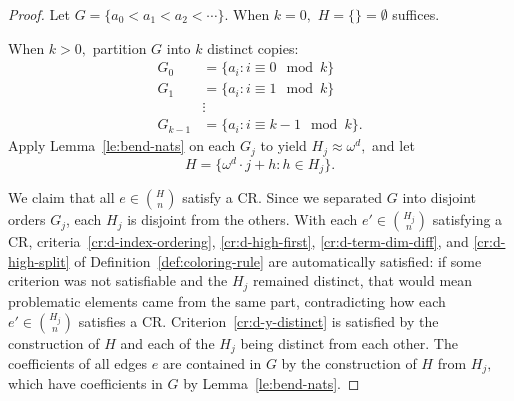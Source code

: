 \documentclass[10pt,a4paper]{article}
\newcommand{\om}{\omega}
\newcommand{\oequiv}{\approx}
\newcommand{\crulenospace}{CR}
\newcommand{\crules}{\crulenospace s~}
\newcommand{\idegr}{j}
\newcommand{\commonconst}{a}
\newcommand{\rareconst}{b}
\theoremstyle{plain}
\theoremstyle{definition}
\begin{document}
\begin{proof}
Let $G = \{\commonconst_0 < \commonconst_1 < \commonconst_2 < \cdots \}$.
When $k = 0,$ $H = \{\} = \emptyset$ suffices.

When $k > 0,$ partition $G$ into $k$ distinct copies: \begin{align*}
    G_0 &= \{a_i : i \equiv 0 \mod k\}\\
    G_1 &= \{a_i : i \equiv 1 \mod k\}\\
    &\vdots\\
    G_{k-1} &= \{a_i : i \equiv k-1 \mod k\}.
\end{align*}
Apply Lemma~\ref{le:bend-nats} on each $G_j$ to yield $H_j \oequiv \om^d,$
and let $$H = 
\{\om^{d} \cdot j + h : h \in H_j\}.$$

We claim that all $e \in \binom{H}{n}$ satisfy a \crulenospace. Since we separated $G$ into disjoint orders $G_{\idegr}$, each $H_{\idegr}$ is disjoint from the others.
With each $e' \in \binom{H_j}{n}$
satisfying a \crulenospace,
criteria~\ref{cr:d-index-ordering}, \ref{cr:d-high-first},
\ref{cr:d-term-dim-diff}, and \ref{cr:d-high-split}
of Definition~\ref{def:coloring-rule}
are automatically satisfied: if some
criterion was not satisfiable and the $H_{\idegr}$ remained distinct, that would
mean problematic elements came from the same part, contradicting how each $e' \in \binom{H_j}{n}$
satisfies a \crulenospace.
Criterion~\ref{cr:d-y-distinct} is satisfied by the construction
of $H$ and each of the
$H_{\idegr}$ being distinct from each other.
The coefficients of all edges $e$ are contained in $G$ by the construction of $H$ from $H_j,$
which have coefficients in $G$ by Lemma~\ref{le:bend-nats}.



\end{proof}
\end{document}
